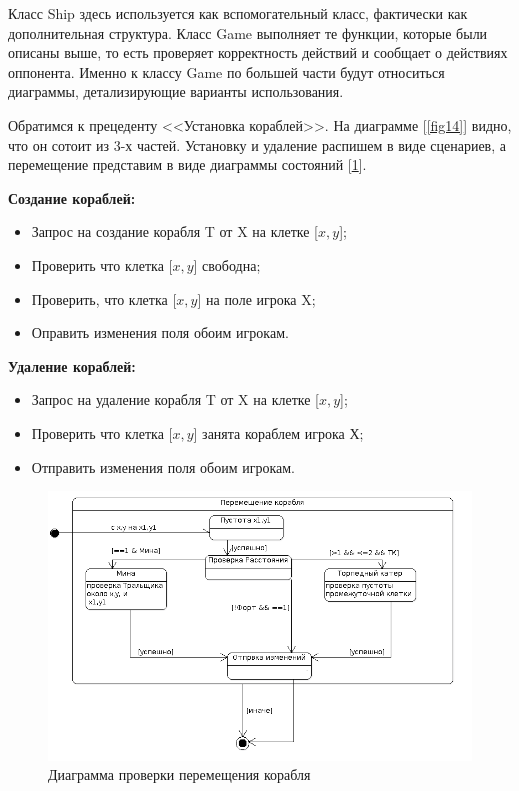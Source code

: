 Класс Ship здесь используется как вспомогательный класс, фактически как дополнительная структура. Класс Game выполняет те функции, которые были описаны выше, то есть проверяет корректность действий и сообщает о действиях оппонента. Именно к классу Game по большей части будут относиться диаграммы, детализирующие варианты использования.

Обратимся к прецеденту <<Установка кораблей>>. На диаграмме [\ref{fig14}] видно, что он сотоит из 3-х частей. Установку и удаление распишем в виде сценариев, а перемещение представим в виде диаграммы состояний [\ref{fig16}].  


\textbf{Создание кораблей:}
	
		\begin{itemize}		
			\item Запрос на создание корабля T от X на клетке [$x,y$];		
			\item Проверить что клетка [$x,y$] свободна;
			\item Проверить, что клетка [$x,y$] на поле игрока X;
			\item Оправить изменения поля обоим игрокам.		
		\end{itemize}


\textbf{Удаление кораблей:}

		\begin{itemize}		
			\item Запрос на удаление корабля T от X на клетке [$x,y$];		
			\item Проверить что клетка [$x,y$] занята кораблем игрока Х;
		\item Отправить изменения поля обоим игрокам.	
		\end{itemize}


\begin{figure}[htp]
\centering
\includegraphics[width=16cm]{images/statemove.png}
\caption{Диаграмма проверки перемещения корабля}
\label{fig16}
\end{figure}

